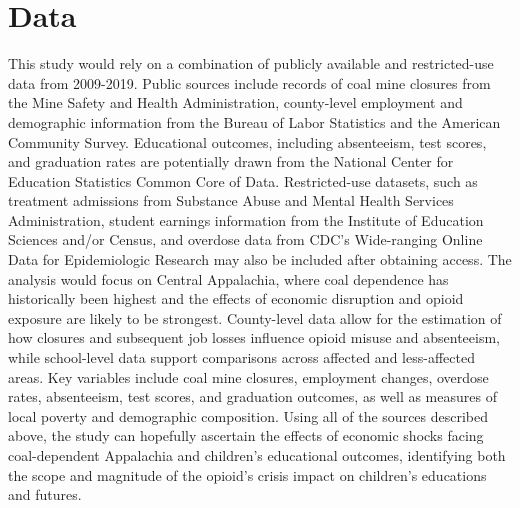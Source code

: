 \section*{Data}
This study would rely on a combination of publicly available and restricted-use data from 2009-2019. Public sources include records of coal mine closures from the Mine Safety and Health Administration, county-level employment and demographic information from the Bureau of Labor Statistics and the American Community Survey. Educational outcomes, including absenteeism, test scores, and graduation rates are potentially drawn from the National Center for Education Statistics Common Core of Data. Restricted-use datasets, such as treatment admissions from Substance Abuse and Mental Health Services Administration, student earnings information from the Institute of Education Sciences and/or Census, and overdose data from CDC's Wide-ranging Online Data for Epidemiologic Research may also be included after obtaining access. The analysis would focus on Central Appalachia, where coal dependence has historically been highest and the effects of economic disruption and opioid exposure are likely to be strongest. County-level data allow for the estimation of how closures and subsequent job losses influence opioid misuse and absenteeism, while school-level data support comparisons across affected and less-affected areas. Key variables include coal mine closures, employment changes, overdose rates, absenteeism, test scores, and graduation outcomes, as well as measures of local poverty and demographic composition. Using all of the sources described above, the study can hopefully ascertain the effects of economic shocks facing coal-dependent Appalachia and children's educational outcomes, identifying both the scope and magnitude of the opioid's crisis impact on children's educations and futures.

 

